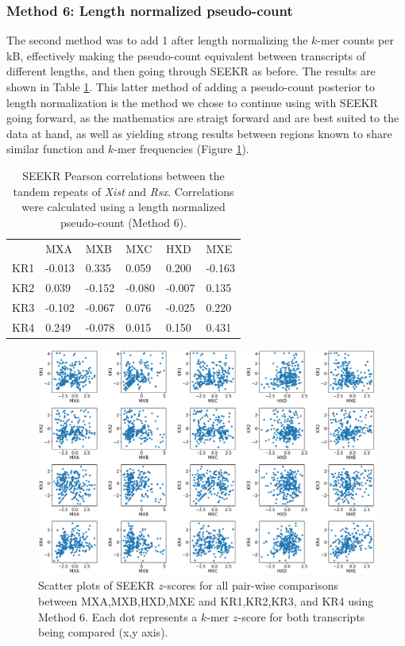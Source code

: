 \subsubsection{Method 6: Length normalized pseudo-count}
The second method was to add 1 after length normalizing the $k$-mer counts per kB, effectively making the pseudo-count equivalent between transcripts of different lengths, and then going through SEEKR as before. The results are shown in Table \ref{tbl:kmers6}. This latter method of adding a pseudo-count posterior to length normalization is the method we chose to continue using with SEEKR going forward, as the mathematics are straigt forward and are best suited to the data at hand, as well as yielding strong results between regions known to share similar function and $k$-mer frequencies (Figure \ref{fig:9plots}). 

\begin{table}[ht]
\begin{center}
\begin{tabular}{llllll}
&MXA & MXB                   & MXC                  & HXD                  & MXE                                        \\
KR1 & -0.013 & 0.335  & 0.059  & 0.200  & -0.163 \\
KR2 & 0.039   & -0.152 & -0.080  & -0.007 & 0.135  \\
KR3 & -0.102   & -0.067 & 0.076  & -0.025 & 0.220   \\
KR4 & 0.249   & -0.078 & 0.015 & 0.150  & 0.431 
\end{tabular}
\caption[Length normalized pseudocount to $k$-mer frequencies]{SEEKR Pearson correlations between the tandem repeats of \emph{Xist} and \emph{Rsx}. Correlations were calculated using a length normalized pseudo-count (Method 6).}
\label{tbl:kmers6}
\end{center}
\end{table}

\begin{figure}[h]
\centering
\includegraphics[width=.9\textwidth]{images/9_figs.pdf}
\caption[Length normalized pseudocount $z$-score scatter plots]{Scatter plots of SEEKR $z$-scores for all pair-wise comparisons between MXA,MXB,HXD,MXE and KR1,KR2,KR3, and KR4 using Method 6. Each dot represents a $k$-mer $z$-score for both transcripts being compared (x,y axis).}
\label{fig:9plots}
\end{figure}


